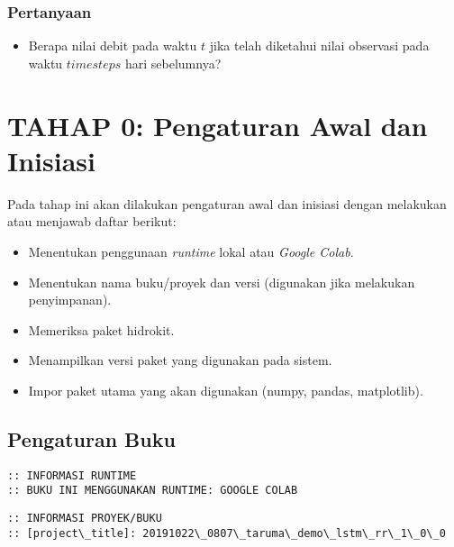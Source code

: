\documentclass[11pt]{article}
\providecommand{\tightlist}{%
      \setlength{\itemsep}{0pt}\setlength{\parskip}{0pt}}
\begin{document}
\hypertarget{pertanyaan}{%
\subsubsection{Pertanyaan}\label{pertanyaan}}

\begin{itemize}
\tightlist
\item
  Berapa nilai debit pada waktu \(t\) jika telah diketahui nilai
  observasi pada waktu \(timesteps\) hari sebelumnya?
\end{itemize}

    \hypertarget{tahap-0-pengaturan-awal-dan-inisiasi}{%
\section{TAHAP 0: Pengaturan Awal dan
Inisiasi}\label{tahap-0-pengaturan-awal-dan-inisiasi}}

Pada tahap ini akan dilakukan pengaturan awal dan inisiasi dengan
melakukan atau menjawab daftar berikut:

\begin{itemize}
\tightlist
\item
  Menentukan penggunaan \emph{runtime} lokal atau \emph{Google Colab}.
\item
  Menentukan nama buku/proyek dan versi (digunakan jika melakukan
  penyimpanan).
\item
  Memeriksa paket hidrokit.
\item
  Menampilkan versi paket yang digunakan pada sistem.
\item
  Impor paket utama yang akan digunakan (numpy, pandas, matplotlib).
\end{itemize}

    \hypertarget{pengaturan-buku}{%
\subsection{Pengaturan Buku}\label{pengaturan-buku}}

    \begin{Verbatim}[commandchars=\\\{\}]
:: INFORMASI RUNTIME
:: BUKU INI MENGGUNAKAN RUNTIME: GOOGLE COLAB
    \end{Verbatim}

    \begin{Verbatim}[commandchars=\\\{\}]
:: INFORMASI PROYEK/BUKU
:: [project\_title]: 20191022\_0807\_taruma\_demo\_lstm\_rr\_1\_0\_0
    \end{Verbatim}
\end{document}

